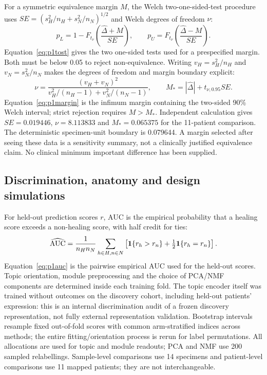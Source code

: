 For a symmetric equivalence margin $M$, the Welch two-one-sided-test procedure uses $SE=(s_H^2/n_H+s_N^2/n_N)^{1/2}$ and Welch degrees of freedom $\nu$:
\begin{equation}
p_L=1-F_{t_\nu}\!\left(\frac{\widehat\Delta+M}{SE}\right),\qquad
p_U=F_{t_\nu}\!\left(\frac{\widehat\Delta-M}{SE}\right).\label{eq:p1tost}
\end{equation}
Equation~\eqref{eq:p1tost} gives the two one-sided tests used for a prespecified margin. Both must be below 0.05 to reject non-equivalence. Writing $v_H=s_H^2/n_H$ and $v_N=s_N^2/n_N$ makes the degrees of freedom and margin boundary explicit:
\begin{equation}
\nu=\frac{(v_H+v_N)^2}{v_H^2/(n_H-1)+v_N^2/(n_N-1)},\qquad
M_*=|\widehat\Delta|+t_{\nu,0.95}SE.\label{eq:p1margin}
\end{equation}
Equation~\eqref{eq:p1margin} is the infimum margin containing the two-sided 90\% Welch interval; strict rejection requires $M>M_*$. Independent calculation gives $SE=0.019446$, $\nu=8.113833$ and $M_*=0.065375$ for the 11-patient comparison. The deterministic specimen-unit boundary is 0.079644. A margin selected after seeing these data is a sensitivity summary, not a clinically justified equivalence claim. No clinical minimum important difference has been supplied.

\subsection{Discrimination, anatomy and design simulations}
For held-out prediction scores $r$, AUC is the empirical probability that a healing score exceeds a non-healing score, with half credit for ties:
\begin{equation}
\widehat{\rm AUC}=\frac1{n_Hn_N}\sum_{h\in H,n\in N}\left[\mathbf{1}\{r_h>r_n\}+\tfrac12\mathbf{1}\{r_h=r_n\}\right].\label{eq:p1auc}
\end{equation}
Equation~\eqref{eq:p1auc} is the pairwise empirical AUC used for the held-out scores. Topic orientation, module preprocessing and the choice of PCA/NMF components are determined inside each training fold. The topic encoder itself was trained without outcomes on the discovery cohort, including held-out patients' expression: this is an internal discrimination audit of a frozen discovery representation, not fully external representation validation. Bootstrap intervals resample fixed out-of-fold scores with common arm-stratified indices across methods; the entire fitting/orientation process is rerun for label permutations. All allocations are used for topic and module readouts; PCA and NMF use 200 sampled relabellings. Sample-level comparisons use 14 specimens and patient-level comparisons use 11 mapped patients; they are not interchangeable.

